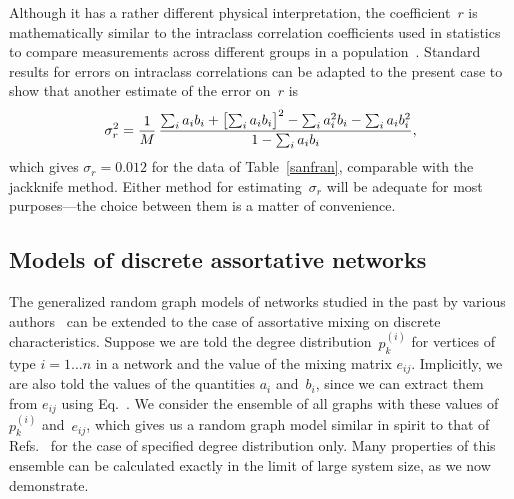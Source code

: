 \documentclass[twocolumn,pre]{revtex4}
\begin{document}
Although it has a rather different physical interpretation, the
coefficient~$r$ is mathematically similar to the intraclass correlation
coefficients used in statistics to compare measurements across different
groups in a population~\cite{Fleiss81}.  Standard results for errors on
intraclass correlations can be adapted to the present case to show that
another estimate of the error on~$r$ is~\cite{FCE69}
\begin{equation}
\sigma_r^2 = {1\over M}\,
             {\sum_i a_i b_i + \bigl[\sum_i a_i b_i\bigr]^2
              - \sum_i a_i^2 b_i - \sum_i a_i b_i^2\over
              1 - \sum_i a_i b_i},
\label{fleiss}
\end{equation}
which gives $\sigma_r=0.012$ for the data of Table~\ref{sanfran},
comparable with the jackknife method.  Either method for
estimating~$\sigma_r$ will be adequate for most purposes---the choice
between them is a matter of convenience.




\subsection{Models of discrete assortative networks}
\label{modelsdisc}
The generalized random graph models of networks studied in the past by
various authors~\cite{BC78,Luczak92,MR95,MR98,ACL00,NSW01,NWS02}
can be extended to the case of assortative mixing on discrete
characteristics.  Suppose we are told the degree distribution~$p_k^{(i)}$
for vertices of type $i=1\ldots n$ in a network and the value of the mixing
matrix $e_{ij}$.  Implicitly, we are also told the values of the quantities
$a_i$ and~$b_i$, since we can extract them from $e_{ij}$ using
Eq.~.  We consider the ensemble of all graphs with these
values of $p_k^{(i)}$ and~$e_{ij}$, which gives us a random graph model
similar in spirit to that of
Refs.~ for
the case of specified degree distribution only.  Many properties of this
ensemble can be calculated exactly in the limit of large system size, as we
now demonstrate.
\end{document}
